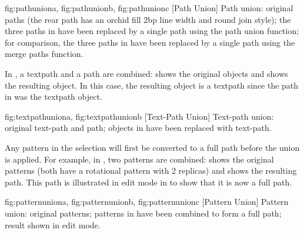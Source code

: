 {
  {fig:pathuniona}{}{},
  {fig:pathunionb}{}{},
  {fig:pathunionc}{}{}
}
[Path Union]
{Path union:
 original paths (the rear path has an
orchid fill  2bp line width and round join style);
 the three paths in
 have been replaced by a single path using
the path union function;
 for comparison, the three paths in
 have been replaced by a single path using
the merge paths function.}

In , a \gls*{textpath} and a
\gls*{path} are combined:  shows
the original objects and  shows
the resulting object. In this case, the resulting object is a
\gls*{textpath} since the  path in
 was the \gls*{textpath} object.

{
  {fig:textpathuniona}{}{},
  {fig:textpathunionb}{}{}
}
[Text-Path Union]
{Text-path union:  original text-path
and path;  objects in
 have been replaced with text-path.}

Any \gls{pattern} in the selection will first be converted to a full
\gls{path} before the union is applied. For example, in
, two patterns are combined:
 shows the original patterns (both have
a rotational pattern with 2 replicas) and
 shows the resulting path. This path is
illustrated in edit mode in  to show
that it is now a full path.

{
  {fig:patternuniona}{}{},
  {fig:patternunionb}{}{},
  {fig:patternunionc}{}{}
}
[Pattern Union]
{Pattern union:  original patterns;
 patterns in
 have been combined to form a full
path;  result shown in edit mode.}


